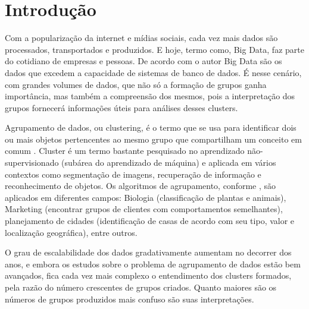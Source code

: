 

\chapter{Introdução}

Com a popularização da internet e mídias sociais, cada vez mais dados são processados, transportados e produzidos. E hoje, termo como, Big Data, faz parte do cotidiano de empresas e pessoas. De acordo com o autor  Big Data são os dados que excedem a capacidade de sistemas de banco de dados. É nesse cenário, com grandes volumes de dados, que não só a formação de grupos ganha importância, mas também a compreensão dos mesmos, pois a interpretação dos grupos fornecerá informações úteis para análises desses clusters.

Agrupamento de dados, ou clustering, é o termo que se usa para identificar dois ou mais objetos pertencentes ao mesmo grupo que compartilham um conceito em comum \cite{Kumar2013}. Cluster é um termo bastante pesquisado no aprendizado não-supervisionado (subárea do aprendizado de máquina) e  aplicada em vários contextos como segmentação de imagens, recuperação de informação e reconhecimento de objetos. Os algoritmos de agrupamento, conforme , são aplicados em diferentes campos: Biologia (classificação de plantas e animais), Marketing (encontrar grupos de clientes com comportamentos semelhantes), planejamento de cidades (identificação de casas de acordo com seu tipo, valor e localização geográfica), entre outros.

O grau de escalabilidade dos dados gradativamente aumentam no decorrer dos anos, e embora os estudos sobre o problema de agrupamento de dados estão bem avançados, fica cada vez mais complexo o entendimento dos clusters formados, pela razão do número crescentes de grupos criados. Quanto maiores são os números de grupos produzidos  mais  confuso são suas interpretações. 

